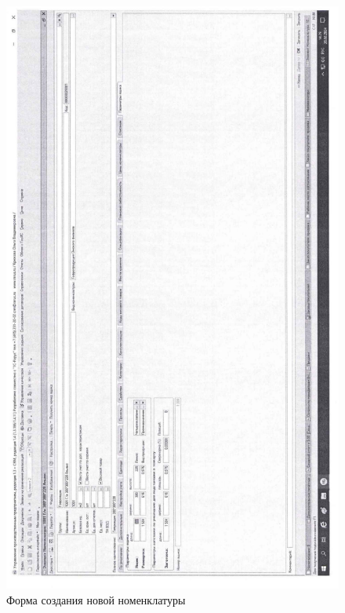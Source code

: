 \begin{figure}
\begin{center}
  \includegraphics[width=\linewidth, height=0.94\textheight, keepaspectratio]{Pics/d05.jpg}
\end{center}
  \caption{Форма создания новой номенклатуры}
  \label{pic:d05}
\end{figure}
\clearpage

